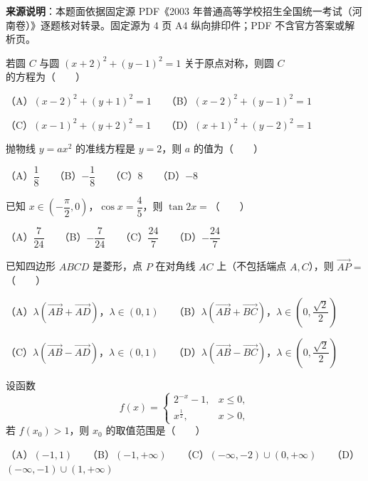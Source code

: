 

\begin{gktip}
\textbf{来源说明}：本题面依据固定源 PDF《2003 年普通高等学校招生全国统一考试（河南卷）》逐题核对转录。固定源为 4 页 A4 纵向排印件；PDF 不含官方答案或解析页。
\end{gktip}

\begin{question}
若圆 $C$ 与圆 $(x+2)^2 + (y-1)^2 = 1$ 关于原点对称，则圆 $C$ 的方程为\mbox{（　　）}

（A）$(x-2)^2 + (y+1)^2 = 1$　　（B）$(x-2)^2 + (y-1)^2 = 1$

（C）$(x-1)^2 + (y+2)^2 = 1$　　（D）$(x+1)^2 + (y-2)^2 = 1$

\end{question}
\begin{question}
抛物线 $y = ax^2$ 的准线方程是 $y = 2$，则 $a$ 的值为\mbox{（　　）}

（A）$\dfrac{1}{8}$　　（B）$-\dfrac{1}{8}$　　（C）8　　（D）$-8$

\end{question}
\begin{question}
已知 $x \in \left(-\dfrac{\pi}{2}, 0\right)$，$\cos x = \dfrac{4}{5}$，则 $\tan 2x =$\mbox{（　　）}

（A）$\dfrac{7}{24}$　　（B）$-\dfrac{7}{24}$　　（C）$\dfrac{24}{7}$　　（D）$-\dfrac{24}{7}$

\end{question}
\begin{question}
已知四边形 $ABCD$ 是菱形，点 $P$ 在对角线 $AC$ 上（不包括端点 $A, C$），则 $\vec{AP} =$\mbox{（　　）}

（A）$\lambda(\vec{AB} + \vec{AD})$，$\lambda \in (0, 1)$　　（B）$\lambda(\vec{AB} + \vec{BC})$，$\lambda \in \left(0, \dfrac{\sqrt{2}}{2}\right)$

（C）$\lambda(\vec{AB} - \vec{AD})$，$\lambda \in (0, 1)$　　（D）$\lambda(\vec{AB} - \vec{BC})$，$\lambda \in \left(0, \dfrac{\sqrt{2}}{2}\right)$

\end{question}
\begin{question}
设函数
\nopagebreak[4]
\[f(x) = \begin{cases} 2^{-x} - 1, & x \le 0, \\ x^{\frac{1}{2}}, & x > 0, \end{cases}\]
若 $f(x_0) > 1$，则 $x_0$ 的取值范围是\mbox{（　　）}

（A）$(-1, 1)$　　（B）$(-1, +\infty)$　　（C）$(-\infty, -2) \cup (0, +\infty)$　　（D）$(-\infty, -1) \cup (1, +\infty)$

\end{question}
